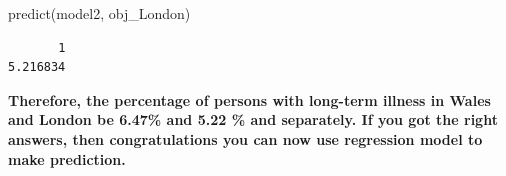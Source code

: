 \documentclass[
  letterpaper,
  DIV=11,
  numbers=noendperiod]{scrreprt}
\newenvironment{Shaded}{\begin{snugshade}}{\end{snugshade}}
\newcommand{\FunctionTok}[1]{\textcolor[rgb]{0.28,0.35,0.67}{#1}}
\newcommand{\NormalTok}[1]{\textcolor[rgb]{0.00,0.23,0.31}{#1}}
\begin{document}
\begin{Shaded}
\begin{Highlighting}[]
\FunctionTok{predict}\NormalTok{(model2, obj\_London)}
\end{Highlighting}
\end{Shaded}

\begin{verbatim}
       1 
5.216834 
\end{verbatim}

\textbf{Therefore, the percentage of persons with long-term illness in
Wales and London be 6.47\% and 5.22 \% and separately. If you got the
right answers, then congratulations you can now use regression model to
make prediction.}
\end{document}
